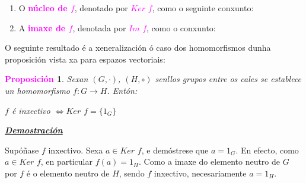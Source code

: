 \documentclass[twoside]{report}
\newcommand{\magbf}[1]{\textcolor{magenta}{\textbf{#1}}} %
\theoremstyle{mystyle}
\newtheorem{prop}{\magbf{Proposición}}[chapter]
\newenvironment{proposition}
{\begin{mdframed}[linecolor = magenta,backgroundcolor = classicrose, linewidth = 2mm]\begin{prop}}
{\end{prop}\end{mdframed}}
\begin{document}
\begin{enumerate}
    \item O \textcolor{magenta}{\textbf{núcleo de $f$}}, denotado por \textcolor{magenta}{$Ker$ $f$}, como o seguinte conxunto:

    \begin{center}
    \end{center}
    
    \item A \textcolor{magenta}{\textbf{imaxe de $f$}}, denotada por \textcolor{magenta}{$Im$ $f$}, como o conxunto:
    
    \begin{center}
    \end{center}
\end{enumerate}

\vspace{3mm}

\noindent O seguinte resultado é a xeneralización ó caso dos homomorfismos dunha proposición vista xa para espazos vectoriais:\\

\begin{proposition} \label{prop1.7}
Sexan $(G, \cdot)$, $(H, \circ)$ senllos grupos entre os cales se establece un homomorfismo $f: G \longrightarrow H$. Entón:
\begin{center}
    $f$ é inxectivo $\Longleftrightarrow Ker$ $f = \{1_{G}\}$
\end{center}
\end{proposition}

\vspace{2mm}

\noindent \textbf{\textit{\underline{Demostración}}}

\vspace{2mm}

\noindent {} Supóñase $f$ inxectivo. Sexa $a \in Ker$ $f$, e demóstrese que $a = 1_{G}$. En efecto, como $a \in Ker$ $f$, en particular $f(a) = 1_{H}$. Como a imaxe do elemento neutro de $G$ por $f$ é o elemento neutro de $H$, sendo $f$ inxectivo, necesariamente $a = 1_{H}$.\\
\end{document}
